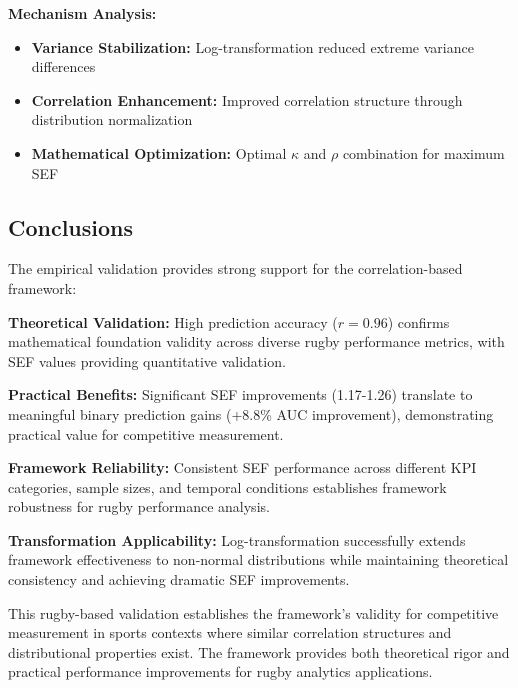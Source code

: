 \textbf{Mechanism Analysis:}
\begin{itemize}
    \item \textbf{Variance Stabilization:} Log-transformation reduced extreme variance differences
    \item \textbf{Correlation Enhancement:} Improved correlation structure through distribution normalization
    \item \textbf{Mathematical Optimization:} Optimal $\kappa$ and $\rho$ combination for maximum SEF
\end{itemize}

\subsection{Conclusions}

The empirical validation provides strong support for the correlation-based framework:

\textbf{Theoretical Validation:} High prediction accuracy ($r = 0.96$) confirms mathematical foundation validity across diverse rugby performance metrics, with SEF values providing quantitative validation.

\textbf{Practical Benefits:} Significant SEF improvements (1.17-1.26) translate to meaningful binary prediction gains (+8.8\% AUC improvement), demonstrating practical value for competitive measurement.

\textbf{Framework Reliability:} Consistent SEF performance across different KPI categories, sample sizes, and temporal conditions establishes framework robustness for rugby performance analysis.

\textbf{Transformation Applicability:} Log-transformation successfully extends framework effectiveness to non-normal distributions while maintaining theoretical consistency and achieving dramatic SEF improvements.

This rugby-based validation establishes the framework's validity for competitive measurement in sports contexts where similar correlation structures and distributional properties exist. The framework provides both theoretical rigor and practical performance improvements for rugby analytics applications.
